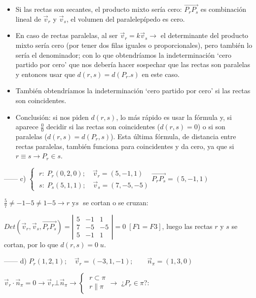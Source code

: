 \begin{proofw}
\begin{itemize}
\item \textcolor{gris}{Si las rectas son secantes, el producto mixto sería cero: $\overrightarrow{P_rP_s}$ es combinación lineal de $\vec v_r$ y $\vec v_s$, el volumen del paralelepípedo es cero.}
\item \textcolor{gris}{En caso de rectas paralelas, al ser $\vec v_r =k\vec v_s \to $ el determinante del producto mixto sería cero (por tener dos filas iguales o proporcionales), pero también lo sería el denominador; con lo que obtendríamos la indeterminación `cero partido por cero' que nos debería hacer sospechar que las rectas son paralelas y entonces usar que $d(r,s)=d(P_r.s)$ en este caso.}
\item \textcolor{gris}{	También obtendríamos la indeterminación `cero partido por cero' si las rectas son coincidentes.}
\item \textcolor{gris}{	Conclusión: si nos piden $d(r,s)$, lo más rápido es usar la fórmula y, si aparece $\frac 0 0$ decidir si las rectas son coincidentes ($d(r,s)=0$) o si son paralelas ($d(r,s)=d(P_r,s)$). Esta última fórmula, de distancia entre rectas paralelas, también funciona para coincidentes y da cero, ya que si $r\equiv s \to P_r \in s$.}
\end{itemize}

\noindent ------ c) $\begin{cases}\; r:\; P_r(0,2,0);\quad \vec v_r=(5,-1,1) \\ \; s:\; P_s(5,1,1);\quad \vec v_s=(7,-5,-5) \end{cases} \overrightarrow{P_rP_s}=(5,-1,1)$

\noindent $\frac 5 7 \neq {-1}{-5} \neq 1 {-5} \to r \text{ y} s \;$ se cortan o se cruzan:

\noindent $Det(\vec v_r, \vec v_s,\overrightarrow{P_rP_s})= \left|\begin{matrix} 5&-1&1\\7&-5&-5\\5&-1&1 \end{matrix} \right| =0 \; $\textcolor{gris}{$[F1=F3]$}, luego las rectas $r$ y $s$ se cortan, por lo que $d(r,s)=0\; u$.

\noindent ------ d) $P_r(1,2,1); \quad \vec v_r=(-3,1,-1);\qquad \vec n_{\pi}=(1,3,0)$

\noindent $\vec v_r \cdot \vec n_{\pi}= 0 \to \vec v_r \bot \vec n_{\pi} \rightarrow \begin{cases} \; r\subset \pi \\ \; r \parallel \pi \end{cases} \to $ ¿$P_r \in \pi$?:


\end{proofw}
